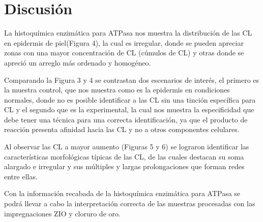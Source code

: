 
\vspace{-0.5cm}
\section*{Discusión}

La histoquímica enzimática para ATPasa nos muestra la distribución de las CL en epidermis de piel(Figura 4), la cual es irregular, donde se pueden apreciar zonas con una mayor concentración de CL (cúmulos de CL) y otras donde se apreció un arreglo más ordenado y homogéneo.

Comparando la Figura 3 y 4 se contrastan dos escenarios de interés, el primero es la muestra control, que nos muestra como es la epidermis en condiciones normales, donde no es posible identificar a las CL sin una tinción específica para CL y el segundo que es la experimental, la cual nos muestra la especificidad que debe tener una técnica para una correcta identificación, ya que el producto de reacción presenta afinidad hacia las CL y no a otros componentes celulares.

Al observar las CL a mayor aumento (Figuras 5 y 6) se lograron identificar las características morfológicas típicas de las CL, de las cuales destacan su soma alargado e irregular y sus múltiples y largas prolongaciones que forman redes entre ellas.

Con la información recabada de la histoquímica enzimática para ATPasa se podrá llevar a cabo la interpretación correcta de las muestras procesadas con las impregnaciones ZIO y cloruro de oro.

